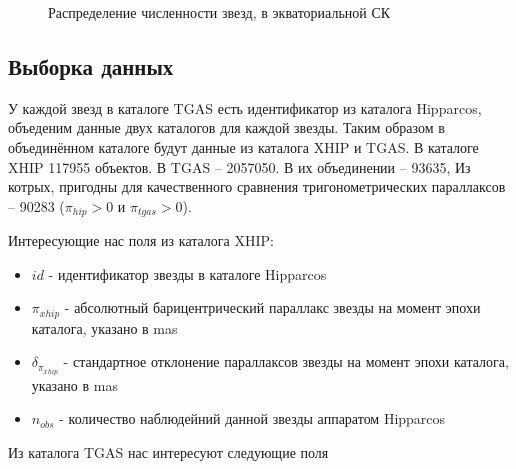 \documentclass[14pt]{article} %
\begin{document}
\begin{figure}[h!]
\caption{Распределение численности звезд, в экваториальной СК}
\label{img:hixpix500}
\end{figure}

\subsection{Выборка данных}\label{sub:smthzd}
У каждой звезд в каталоге TGAS есть идентификатор из каталога Hipparcos, объеденим данные двух каталогов для каждой звезды. Таким образом в объединённом каталоге будут данные из каталога XHIP и TGAS. В каталоге XHIP 117955 объектов. В TGAS -- 2057050. В их объединении -- 93635, Из котрых, пригодны для качественного сравнения тригонометрических параллаксов -- 90283 ($\pi_{hip} > 0$ и $\pi_{tgas}>0$).


Интересующие нас поля из каталога XHIP:

\begin{itemize}

\item $id$ - идентификатор звезды в каталоге Hipparcos

\item $\pi_{xhip}$ - абсолютный барицентрический параллакс звезды на момент эпохи каталога, указано в mas

\item $\delta_{\pi_{xhip}}$ - стандартное отклонение параллаксов звезды на момент эпохи каталога, указано в mas

\item $n_{obs}$ - количество наблюдейний данной звезды аппаратом Hipparcos

\end{itemize}

Из каталога TGAS нас интересуют следующие поля
\end{document}
